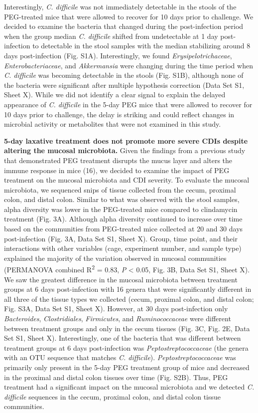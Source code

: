 \documentclass[
  11pt,
]{article}
\begin{document}
Interestingly, \emph{C. difficile} was not immediately detectable in the
stools of the PEG-treated mice that were allowed to recover for 10 days
prior to challenge. We decided to examine the bacteria that changed
during the post-infection period when the group median \emph{C.
difficile} shifted from undetectable at 1 day post-infection to
detectable in the stool samples with the median stabilizing around 8
days post-infection (Fig. S1A). Interestingly, we found
\emph{Erysipelotrichaceae}, \emph{Enterobacteriaceae}, and
\emph{Akkermansia} were changing during the time period when \emph{C.
difficile} was becoming detectable in the stools (Fig. S1B), although
none of the bacteria were significant after multiple hypothesis
correction (Data Set S1, Sheet X). While we did not identify a clear
signal to explain the delayed appearance of \emph{C. difficile} in the
5-day PEG mice that were allowed to recover for 10 days prior to
challenge, the delay is striking and could reflect changes in microbial
activity or metabolites that were not examined in this study.

\textbf{5-day laxative treatment does not promote more severe CDIs
despite altering the mucosal microbiota.} Given the findings from a
previous study that demonstrated PEG treatment disrupts the mucus layer
and alters the immune response in mice (16), we decided to examine the
impact of PEG treatment on the mucosal microbiota and CDI severity. To
evaluate the mucosal microbiota, we sequenced snips of tissue collected
from the cecum, proximal colon, and distal colon. Similar to what was
observed with the stool samples, alpha diversity was lower in the
PEG-treated mice compared to clindamycin treatment (Fig. 3A). Although
alpha diversity continued to increase over time based on the communities
from PEG-treated mice collected at 20 and 30 days post-infection (Fig.
3A, Data Set S1, Sheet X). Group, time point, and their interactions
with other variables (cage, experiment number, and sample type)
explained the majority of the variation observed in mucosal communities
(PERMANOVA combined R\textsuperscript{2} = 0.83, \emph{P} \textless{}
0.05, Fig. 3B, Data Set S1, Sheet X). We saw the greatest difference in
the mucosal microbiota between treatment groups at 6 days post-infection
with 16 genera that were significantly different in all three of the
tissue types we collected (cecum, proximal colon, and distal colon; Fig.
S3A, Data Set S1, Sheet X). However, at 30 days post-infection only
\emph{Bacteroides}, \emph{Clostridiales}, \emph{Firmicutes}, and
\emph{Ruminococcaceae} were different between treatment groups and only
in the cecum tissues (Fig. 3C, Fig. 2E, Data Set S1, Sheet X).
Interestingly, one of the bacteria that was different between treatment
groups at 6 days post-infection was \emph{Peptostreptococcaceae} (the
genera with an OTU sequence that matches \emph{C. difficile}).
\emph{Peptostreptococcaceae} was primarily only present in the 5-day PEG
treatment group of mice and decreased in the proximal and distal colon
tissues over time (Fig. S2B). Thus, PEG treatment had a significant
impact on the mucosal microbiota and we detected \emph{C. difficile}
sequences in the cecum, proximal colon, and distal colon tissue
communities.
\end{document}
